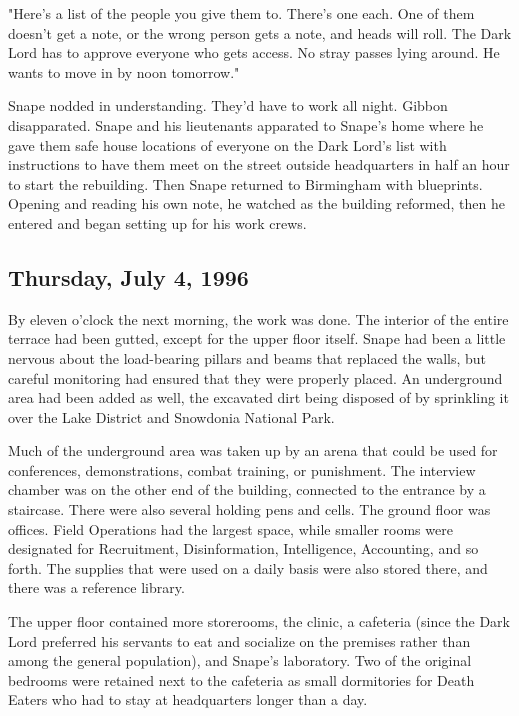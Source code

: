 "Here's a list of the people you give them to. There's one each. One of them doesn't get a note, or the wrong person gets a note, and heads will roll. The Dark Lord has to approve everyone who gets access. No stray passes lying around. He wants to move in by noon tomorrow."

Snape nodded in understanding. They'd have to work all night. Gibbon disapparated. Snape and his lieutenants apparated to Snape's home where he gave them safe house locations of everyone on the Dark Lord's list with instructions to have them meet on the street outside headquarters in half an hour to start the rebuilding. Then Snape returned to Birmingham with blueprints. Opening and reading his own note, he watched as the building reformed, then he entered and began setting up for his work crews.

\subsection{Thursday, July 4, 1996}

By eleven o'clock the next morning, the work was done. The interior of the entire terrace had been gutted, except for the upper floor itself. Snape had been a little nervous about the load-bearing pillars and beams that replaced the walls, but careful monitoring had ensured that they were properly placed. An underground area had been added as well, the excavated dirt being disposed of by sprinkling it over the Lake District and Snowdonia National Park.

Much of the underground area was taken up by an arena that could be used for conferences, demonstrations, combat training, or punishment. The interview chamber was on the other end of the building, connected to the entrance by a staircase. There were also several holding pens and cells. The ground floor was offices. Field Operations had the largest space, while smaller rooms were designated for Recruitment, Disinformation, Intelligence, Accounting, and so forth. The supplies that were used on a daily basis were also stored there, and there was a reference library.

The upper floor contained more storerooms, the clinic, a cafeteria (since the Dark Lord preferred his servants to eat and socialize on the premises rather than among the general population), and Snape's laboratory. Two of the original bedrooms were retained next to the cafeteria as small dormitories for Death Eaters who had to stay at headquarters longer than a day.

